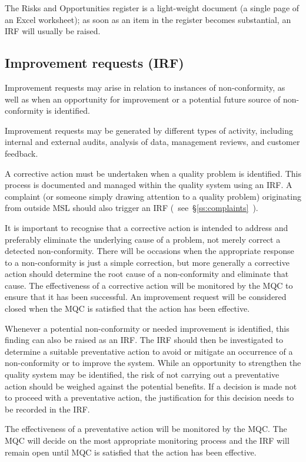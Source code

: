 The Risks and Opportunities register is a light-weight document (a single page of an Excel worksheet); as soon as an item in the register becomes substantial, an IRF will usually be raised. 

\subsection{Improvement requests (IRF)}
Improvement requests may arise in relation to instances of non-conformity, as well as when an opportunity for improvement or a potential future source of non-conformity is identified. 

Improvement requests may be generated by different types of activity, including internal and external audits, analysis of data, management reviews, and customer feedback. 

A corrective action must be undertaken when a quality problem is identified. This process is documented and managed within the quality system using an IRF. A complaint (or someone simply drawing attention to a quality problem) originating from outside MSL should also trigger an IRF (~see~\S\ref{ss:complaints}~).

It is important to recognise that a corrective action is intended to address and preferably eliminate the underlying cause of a problem, not merely correct a detected non-conformity. There will be occasions when the appropriate response to a non-conformity is just a simple correction, but more generally a corrective action should determine the root cause of a non-conformity and eliminate that cause. The effectiveness of a corrective action will be monitored by the MQC to ensure that it has been successful.  An improvement request will be considered closed when the MQC is satisfied that the action has been effective.

Whenever a potential non-conformity or needed improvement is identified, this finding can also be raised as an IRF. The IRF should then be investigated to determine a suitable preventative action to avoid or mitigate an occurrence of a non-conformity or to improve the system. While an opportunity to strengthen the quality system may be identified, the risk of not carrying out a preventative action should be weighed against the potential benefits. If a decision is made not to proceed with a preventative action, the justification for this decision needs to be recorded in the IRF.

The effectiveness of a preventative action will be monitored by the MQC. The MQC will decide on the most appropriate monitoring process and the IRF will remain open until MQC is satisfied that the action has been effective. 

